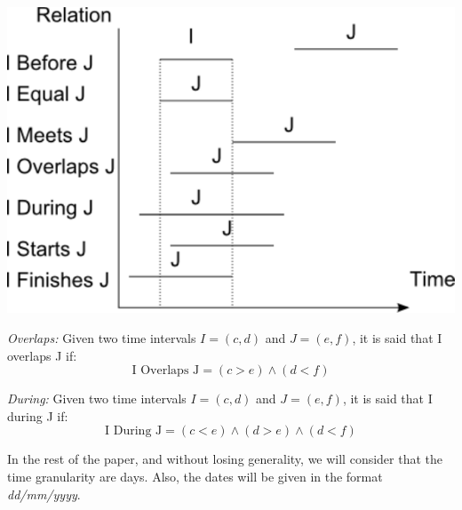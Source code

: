 \vspace*{13pt}
\begin{center}
{
\includegraphics[scale=0.5]{./graphs/allen.pdf}

}
\end{center}
\vspace*{10pt}
\vspace*{13pt}


\begin{definition}
\emph{Overlaps:}
 \label{def:overlaps}
Given two time intervals $I = \left(c, d \right)$ and $J = \left(e, f\right)$, it is said that I overlaps J if:
\begin{equation}
 \label{eqn:overlaps}
\text{I Overlaps J}  = \left(c > e  \right) \wedge \left(d < f  \right) 
\end{equation}
\end{definition}
  

\begin{definition}
\emph{During:}
 \label{def:during}
Given two time intervals $I = \left(c, d \right)$ and $J = \left(e, f\right)$, it is said that I during J if:
\begin{equation}
 \label{eqn:during}
\text{I During J}  = \left(c < e  \right) \wedge \left(d > e  \right) \wedge \left(d < f \right)
\end{equation}
\end{definition}

In the rest of the paper, and without losing generality, we will consider that the time granularity are days. Also, the dates will be given in the format \emph{dd/mm/yyyy}.


